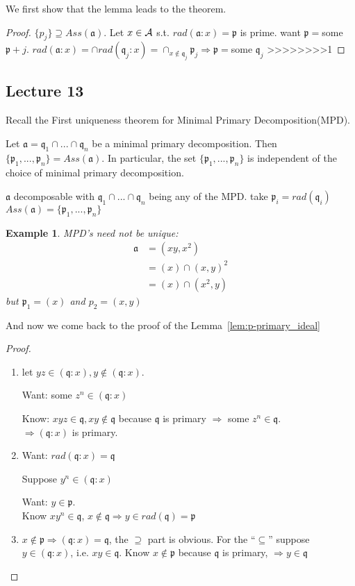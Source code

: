 \documentclass[11pt]{article}
\newtheorem{ex}[thm]{Example}
\newcommand{\sca}{{\mathfrak a}}
\newcommand{\scp}{{\mathfrak p}}
\newcommand{\scq}{\mathfrak q}
\newcommand{\cala}{{\cal A}}
\newcommand{\Lrta}{\Longrightarrow}
\begin{document}
We first show that the lemma leads to the theorem.
\begin{proof}
$\{p_j\}\supseteq Ass(\sca)$. Let $x\in\cala$ s.t. $rad(\sca:x)=\scp$ is prime. want $\scp=$some $\scp+j$. $rad(\sca:x)=\cap rad(\scq_j:x)=\cap_{x\notin\scq_j}\scp_j\Lrta\scp=$some $\scq_j$
>>>>>>>>1
\end{proof}


\subsection{Lecture 13}
Recall the 
First uniqueness theorem for Minimal Primary Decomposition(MPD).

Let $\sca=\scq_1\cap...\cap\scq_n$ be a minimal primary decomposition. Then $\{\scp_1,...,\scp_n\}=Ass(\sca)$. In particular, the set $\{\scp_1,...,\scp_n\}$ is independent of the choice of minimal primary decomposition.

$\sca$ decomposable with $\scq_1\cap...\cap \scq_n$ being any of the MPD. take $\scp_i=rad(\scq_i)$
$Ass(\sca)=\{\scp_1,...,\scp_n\}$

\begin{ex}
MPD's need not be unique:
$$
\begin{aligned}
\sca&=(xy,x^2)\\
&=(x)\cap (x,y)^2\\
& =(x)\cap (x^2,y)
\end{aligned}
$$
but $\scp_1=(x)$ and $p_2=(x,y)$
\end{ex}


And now we come back to the proof of the Lemma~\ref{lem:p-primary_ideal}
\begin{proof}
\begin{enumerate}[label=(\alph*)]
\item let $y z\in(\scq:x),y\notin (\scq:x)$. 

Want: some $z^n\in(\scq:x)$

Know: $xyz\in\scq,xy\notin\scq$ because $\scq$ is primary $\Lrta$ some $z^n\in\scq$.\\
$\Lrta(\scq:x)$ is primary.
\item 
Want: $rad(\scq:x)=\scq$

Suppose $y^n\in(\scq:x)$

Want: $y\in\scp.$\\
Know $xy^n\in\scq$, $x\notin\scq\Lrta y\in rad(\scq)=\scp$
\item 
$x\notin \scp\Lrta (\scq:x)=\scq$, the $\supseteq$ part is obvious. For the ``$\subseteq$'' suppose $y\in(\scq:x)$, i.e. $xy\in\scq$. Know $x\notin\scp$ because $\scq$ is primary, $\Lrta y\in\scq$
\end{enumerate}
\end{proof}
\end{document}
